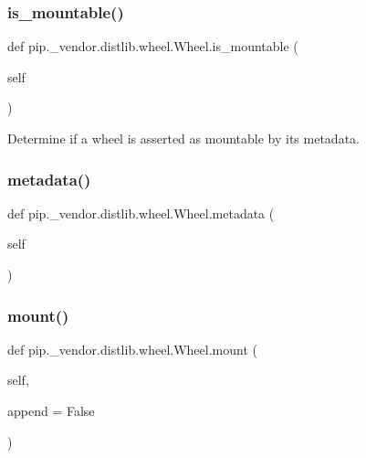 \subsubsection{\texorpdfstring{is\+\_\+mountable()}{is\_mountable()}}
{\footnotesize\ttfamily def pip.\+\_\+vendor.\+distlib.\+wheel.\+Wheel.\+is\+\_\+mountable (\begin{DoxyParamCaption}\item[{}]{self }\end{DoxyParamCaption})}

\begin{DoxyVerb}Determine if a wheel is asserted as mountable by its metadata.
\end{DoxyVerb}
 \mbox{\label{classpip_1_1__vendor_1_1distlib_1_1wheel_1_1Wheel_a520871522a9392772afac6f007c16a14}} 
\subsubsection{\texorpdfstring{metadata()}{metadata()}}
{\footnotesize\ttfamily def pip.\+\_\+vendor.\+distlib.\+wheel.\+Wheel.\+metadata (\begin{DoxyParamCaption}\item[{}]{self }\end{DoxyParamCaption})}

\mbox{\label{classpip_1_1__vendor_1_1distlib_1_1wheel_1_1Wheel_a63bb3e266ae4ce08b7856466b24f7de8}} 
\subsubsection{\texorpdfstring{mount()}{mount()}}
{\footnotesize\ttfamily def pip.\+\_\+vendor.\+distlib.\+wheel.\+Wheel.\+mount (\begin{DoxyParamCaption}\item[{}]{self,  }\item[{}]{append = {\ttfamily False} }\end{DoxyParamCaption})}

